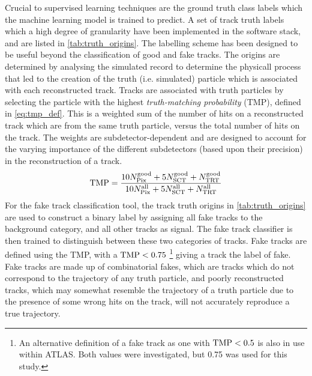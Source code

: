 Crucial to supervised learning techniques are the ground truth class labels which the machine learning model is trained to predict.
A set of track truth labels which a high degree of granularity have been implemented in the \ATLAS software stack, and are listed in \cref{tab:truth_origins}.
The labelling scheme has been designed to be useful beyond the classification of good and fake tracks.
The origins are determined by analysing the simulated record to determine the physicall process that led to the creation of the truth (i.e. simulated) particle which is  associated with each reconstructed track.
Tracks are associated with truth particles by selecting the particle with the highest \textit{truth-matching probability} (TMP), defined in \cref{eq:tmp_def}.
This is a weighted sum of the number of hits on a reconstructed track which are from the same truth particle, versus the total number of hits on the track.
The weights are subdetector-dependent and are designed to account for the varying importance of the different subdetectors (based upon their precision) in the reconstruction of a track.
%
\begin{equation}\label{eq:tmp_def}
    \textnormal{TMP} = 
    \frac{
        10 N_{\textnormal{Pix}}^{\textnormal{good}} + 
        5  N_{\textnormal{SCT}}^{\textnormal{good}} + 
           N_{\textnormal{TRT}}^{\textnormal{good}}
        }{
        10 N_{\textnormal{Pix}}^{\textnormal{all}} + 
        5  N_{\textnormal{SCT}}^{\textnormal{all}} + 
            N_{\textnormal{TRT}}^{\textnormal{all}}
        }
\end{equation}
%
For the fake track classification tool, the track truth origins in \cref{tab:truth_origins} are used to construct a binary label by assigning all fake tracks to the background category, and all other tracks as signal.
The fake track classifier is then trained to distinguish between these two categories of tracks.
Fake tracks are defined using the TMP, with a $\textnormal{TMP} < 0.75$
\footnote{An alternative definition of a fake track as one with $\textnormal{TMP} < 0.5$ is also in use within ATLAS. Both values were investigated, but 0.75 was used for this study.} 
giving a track the label of fake.
Fake tracks are made up of combinatorial fakes, which are tracks which do not correspond to the trajectory of any truth particle, and poorly reconstructed tracks, which may somewhat resemble the trajectory of a truth particle due to the presence of some wrong hits on the track, will not accurately reproduce a true trajectory.



